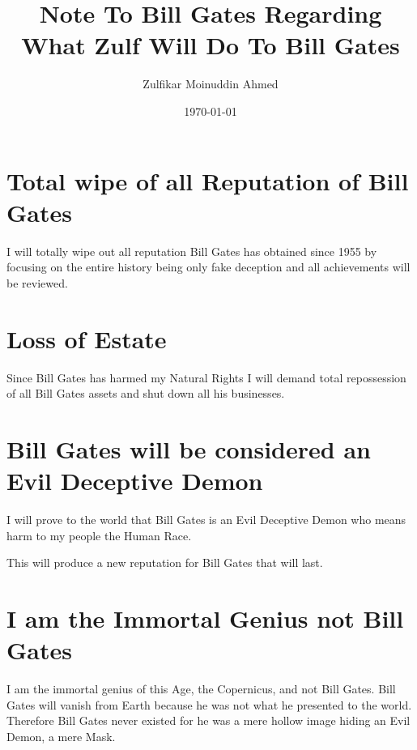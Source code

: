 \documentclass{amsart}
\title{Note To Bill Gates Regarding What Zulf Will Do To Bill Gates}
\author{Zulfikar Moinuddin Ahmed}
\date{\today}
\begin{document}
\maketitle

\section{Total wipe of all Reputation of Bill Gates}

I will totally wipe out all reputation Bill Gates has obtained since 1955 by focusing on the entire history being only fake deception and all achievements will be reviewed.

\section{Loss of Estate}

Since Bill Gates has harmed my Natural Rights I will demand total repossession of all Bill Gates assets and shut down all his businesses.

\section{Bill Gates will be considered an Evil Deceptive Demon}

I will prove to the world that Bill Gates is an Evil Deceptive Demon who means harm to my people the Human Race.  

This will produce a new reputation for Bill Gates that will last.

\section{I am the Immortal Genius not Bill Gates}

I am the immortal genius of this Age, the Copernicus, and not Bill Gates.  Bill Gates will vanish from Earth because he was not what he presented to the world.  Therefore Bill Gates never existed for he was a mere hollow image hiding an Evil Demon, a mere Mask.
\end{document}
